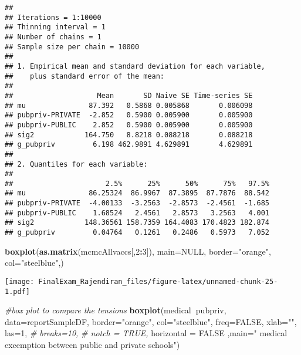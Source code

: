 \documentclass[]{article}
\newenvironment{Shaded}{\begin{snugshade}}{\end{snugshade}}
\newcommand{\CommentTok}[1]{\textcolor[rgb]{0.56,0.35,0.01}{\textit{#1}}}
\newcommand{\DataTypeTok}[1]{\textcolor[rgb]{0.13,0.29,0.53}{#1}}
\newcommand{\DecValTok}[1]{\textcolor[rgb]{0.00,0.00,0.81}{#1}}
\newcommand{\KeywordTok}[1]{\textcolor[rgb]{0.13,0.29,0.53}{\textbf{#1}}}
\newcommand{\NormalTok}[1]{#1}
\newcommand{\OperatorTok}[1]{\textcolor[rgb]{0.81,0.36,0.00}{\textbf{#1}}}
\newcommand{\OtherTok}[1]{\textcolor[rgb]{0.56,0.35,0.01}{#1}}
\newcommand{\StringTok}[1]{\textcolor[rgb]{0.31,0.60,0.02}{#1}}
\begin{document}
\begin{verbatim}
## 
## Iterations = 1:10000
## Thinning interval = 1 
## Number of chains = 1 
## Sample size per chain = 10000 
## 
## 1. Empirical mean and standard deviation for each variable,
##    plus standard error of the mean:
## 
##                    Mean       SD Naive SE Time-series SE
## mu               87.392   0.5868 0.005868       0.006098
## pubpriv-PRIVATE  -2.852   0.5900 0.005900       0.005900
## pubpriv-PUBLIC    2.852   0.5900 0.005900       0.005900
## sig2            164.750   8.8218 0.088218       0.088218
## g_pubpriv         6.198 462.9891 4.629891       4.629891
## 
## 2. Quantiles for each variable:
## 
##                      2.5%      25%      50%      75%   97.5%
## mu               86.25324  86.9967  87.3895  87.7876  88.542
## pubpriv-PRIVATE  -4.00133  -3.2563  -2.8573  -2.4561  -1.685
## pubpriv-PUBLIC    1.68524   2.4561   2.8573   3.2563   4.001
## sig2            148.36561 158.7359 164.4083 170.4823 182.874
## g_pubpriv         0.04764   0.1261   0.2486   0.5973   7.052
\end{verbatim}

\begin{Shaded}
\begin{Highlighting}[]
\KeywordTok{boxplot}\NormalTok{(}\KeywordTok{as.matrix}\NormalTok{(mcmcAllvaccs[,}\DecValTok{2}\OperatorTok{:}\DecValTok{3}\NormalTok{]), }\DataTypeTok{main=}\OtherTok{NULL}\NormalTok{, }\DataTypeTok{border=}\StringTok{"orange"}\NormalTok{, }\DataTypeTok{col=}\StringTok{"steelblue"}\NormalTok{,)}
\end{Highlighting}
\end{Shaded}

\texttt{[image: FinalExam\_Rajendiran\_files/figure-latex/unnamed-chunk-25-1.pdf]}

\begin{Shaded}
\begin{Highlighting}[]
\CommentTok{#box plot to compare the tensions}
\KeywordTok{boxplot}\NormalTok{(medical}\OperatorTok{~}\NormalTok{pubpriv, }\DataTypeTok{data=}\NormalTok{reportSampleDF,}
       \DataTypeTok{border=}\StringTok{"orange"}\NormalTok{, }
       \DataTypeTok{col=}\StringTok{"steelblue"}\NormalTok{,}
       \DataTypeTok{freq=}\OtherTok{FALSE}\NormalTok{,}
       \DataTypeTok{xlab=}\StringTok{""}\NormalTok{,}
       \DataTypeTok{las=}\DecValTok{1}\NormalTok{, }
       \CommentTok{# breaks=10,}
       \CommentTok{# notch = TRUE,}
       \DataTypeTok{horizontal =} \OtherTok{FALSE}\NormalTok{ ,}\DataTypeTok{main=}\StringTok{" medical excemption between public and private schools"}\NormalTok{)}
\end{Highlighting}
\end{Shaded}
\end{document}

